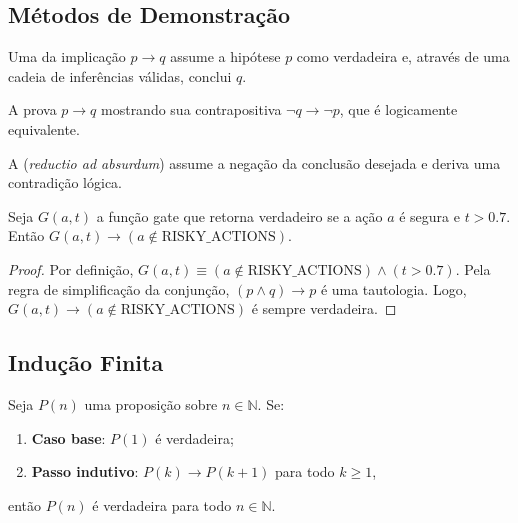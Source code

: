 \subsection{Métodos de Demonstração}

\begin{definicao}
    Uma  da implicação $p \to q$ assume a
    hipótese $p$ como verdadeira e, através de uma cadeia de inferências
    válidas, conclui $q$.
\end{definicao}

\begin{definicao}
    A  prova $p \to q$ mostrando
    sua contrapositiva $\neg q \to \neg p$, que é logicamente equivalente.
\end{definicao}

\begin{definicao}
    A  (\textit{reductio ad absurdum})
    assume a negação da conclusão desejada e deriva uma contradição lógica.
\end{definicao}

\begin{teorema}
    Seja $G(a, t)$ a função gate que retorna verdadeiro se a ação $a$ é
    segura e $t > 0.7$. Então $G(a, t) \to (a \notin \text{RISKY\_ACTIONS})$.
\end{teorema}

\begin{proof}
    Por definição, $G(a, t) \equiv (a \notin \text{RISKY\_ACTIONS}) \land
    (t > 0.7)$. Pela regra de simplificação da conjunção,
    $(p \land q) \to p$ é uma tautologia. Logo, $G(a, t) \to
    (a \notin \text{RISKY\_ACTIONS})$ é sempre verdadeira.
\end{proof}

\subsection{Indução Finita}

\begin{definicao}
    Seja $P(n)$ uma proposição sobre $n \in \mathbb{N}$. Se:
    \begin{enumerate}
        \item \textbf{Caso base}: $P(1)$ é verdadeira;
        \item \textbf{Passo indutivo}: $P(k) \to P(k+1)$ para todo $k \geq 1$,
    \end{enumerate}
    então $P(n)$ é verdadeira para todo $n \in \mathbb{N}$.
\end{definicao}

